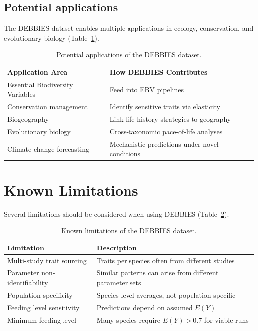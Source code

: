 \documentclass[11pt]{article}
\begin{document}
\subsection{Potential applications}

The DEBBIES dataset enables multiple applications in ecology, conservation, and evolutionary biology (Table~\ref{tab:applications}).

\begin{table}[ht]
\centering
\caption{Potential applications of the DEBBIES dataset.}
\label{tab:applications}
\begin{tabular}{ll}
\toprule
Application Area & How DEBBIES Contributes \\
\midrule
Essential Biodiversity Variables & Feed into EBV pipelines \\
Conservation management & Identify sensitive traits via elasticity \\
Biogeography & Link life history strategies to geography \\
Evolutionary biology & Cross-taxonomic pace-of-life analyses \\
Climate change forecasting & Mechanistic predictions under novel conditions \\
\bottomrule
\end{tabular}
\end{table}

\section{Known Limitations}

Several limitations should be considered when using DEBBIES (Table~\ref{tab:limitations}).

\begin{table}[ht]
\centering
\caption{Known limitations of the DEBBIES dataset.}
\label{tab:limitations}
\begin{tabular}{ll}
\toprule
Limitation & Description \\
\midrule
Multi-study trait sourcing & Traits per species often from different studies \\
Parameter non-identifiability & Similar patterns can arise from different parameter sets \\
Population specificity & Species-level averages, not population-specific \\
Feeding level sensitivity & Predictions depend on assumed $E(Y)$ \\
Minimum feeding level & Many species require $E(Y) > 0.7$ for viable runs \\
\bottomrule
\end{tabular}
\end{table}
\end{document}
